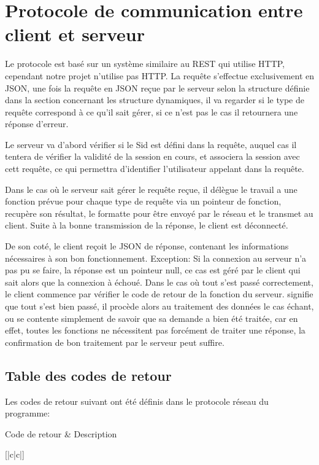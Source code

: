 % 
\section{Protocole de communication entre client et serveur}
Le protocole est basé sur un système similaire au REST qui utilise HTTP, cependant notre projet n'utilise pas HTTP.
La requête s'effectue exclusivement en JSON, une fois la requête en JSON reçue par le serveur selon la structure définie dans la section concernant les structure dynamiques, il va regarder si le type de requête correspond à ce qu'il sait gérer, si ce n'est pas le cas il retournera une réponse d'erreur.\par
Le serveur va d'abord vérifier si le Sid est défini dans la requête, auquel cas il tentera de vérifier la validité de la session en cours, et associera la session avec cett requête, ce qui permettra d'identifier l'utilisateur appelant dans la requête.\par
Dans le cas où le serveur sait gérer le requête reçue, il délègue le travail a une fonction prévue pour chaque type de requête via un pointeur de fonction, recupère son résultat, le formatte pour être envoyé par le réseau et le transmet au client. Suite à la bonne transmission de la réponse, le client est déconnecté.\par

De son coté, le client reçoit le JSON de réponse, contenant les informations nécessaires à son bon fonctionnement. Exception: Si la connexion au serveur n'a pas pu se faire, la réponse est un pointeur null, ce cas est géré par le client qui sait alors que la connexion à échoué. Dans le cas où tout s'est passé correctement, le client commence par vérifier le code de retour de la fonction du serveur.  \fg signifie que tout s'est bien passé, il procède alors au traitement des données le cas échant, ou se contente simplement de savoir que sa demande a bien été traitée, car en effet, toutes les fonctions ne nécessitent pas forcément de traiter une réponse, la confirmation de bon traitement par le serveur peut suffire.\par

\subsection{Table des codes de retour}
Les codes de retour suivant ont été définis dans le protocole réseau du programme:
\begin{center}
	\begin{tabular}[|c|c|]
		\hline
		Code de retour & Description \\
		\hline
		
	\end{tabular}[|c|c|]
\end{center}

% 
